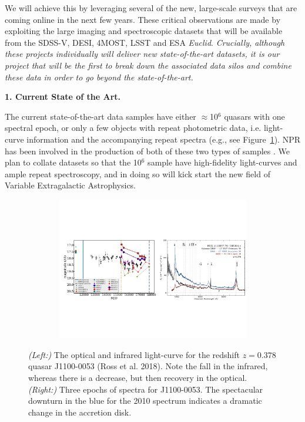 \documentclass[oneside, a4paper, onecolumn, 11pt]{article}
\begin{document}
\smallskip
\smallskip
\noindent
We will achieve this by leveraging several of the new, large-scale surveys that are coming online in the next few years. These critical observations are made by exploiting the large imaging and spectroscopic datasets that will be available from the SDSS-V, DESI, 4MOST, LSST and ESA {\it Euclid}. {\it Crucially, although these  projects individually will deliver new state-of-the-art datasets, it is our project that will be the first to break down the associated data  silos and combine these data in order to go beyond the state-of-the-art.}

\medskip
\medskip
\noindent
\large
{\bf{\textcolor{Cerulean}{1. Current State of the Art.}}}
\normalsize

\smallskip
\noindent
The current state-of-the-art data samples have either $\approx$10$^{6}$ quasars with one spectral epoch, or only a few objects with repeat photometric data, i.e. light-curve information and the accompanying repeat spectra (e.g., see Figure~\ref{fig:J110057}).  NPR has been involved in the production of both of these two types of samples \citep{Paris2017, MacLeod2016, Ross2018}. We plan to collate datasets so that the 10$^{6}$ sample have high-fidelity light-curves and ample repeat spectroscopy, 
and in doing so will kick start the new field of Variable Extragalactic Astrophysics. 


\begin{figure}[h]
  \begin{center}
    \hspace{-0.5cm}
    \includegraphics[height=6.25cm,width=17.2cm]
    {figures/J110057_LC_Spectra_20171024.pdf}
    \vspace{-10pt}
    \caption{%
      \footnotesize 
      {\it (Left:)} The optical and infrared light-curve for the redshift $z=0.378$ quasar 
      J1100-0053 (Ross et al. 2018). 
      Note the fall in the infrared, whereas there is a decrease, but 
      then recovery in the optical. 
      {\it (Right:)} 
      Three epochs of spectra for J1100-0053. 
      The spectacular downturn in the blue for the 2010 spectrum 
      indicates a dramatic change in the accretion disk.
    }
  \vspace{-16pt}
 \label{fig:J110057}
\end{center}
\end{figure}
\end{document}
